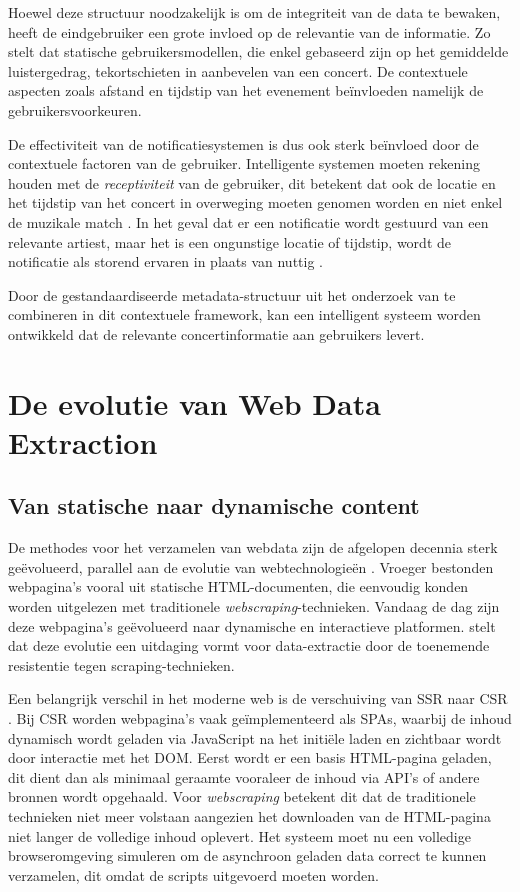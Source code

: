 Hoewel deze structuur noodzakelijk is om de integriteit van de data te bewaken, heeft de eindgebruiker een grote invloed op de relevantie van de informatie.
Zo stelt \textcite{Zangerle2018} dat statische gebruikersmodellen, die enkel gebaseerd zijn op het gemiddelde luistergedrag,
tekortschieten in aanbevelen van een concert. De contextuele aspecten zoals afstand en tijdstip van het evenement beïnvloeden namelijk de gebruikersvoorkeuren.

De effectiviteit van de notificatiesystemen is dus ook sterk beïnvloed door de contextuele factoren van de gebruiker.
Intelligente systemen moeten rekening houden met de \textit{receptiviteit} van de gebruiker, 
dit betekent dat ook de locatie en het tijdstip van het concert in overweging moeten genomen worden en niet enkel de muzikale match \autocite{NotificationSurvey2017}.
In het geval dat er een notificatie wordt gestuurd van een relevante artiest, maar het is een ongunstige locatie of tijdstip, 
wordt de notificatie als storend ervaren in plaats van nuttig \autocite{NotificationSurvey2017}.

Door de gestandaardiseerde metadata-structuur uit het onderzoek van \textcite{Graves2003} te combineren in dit contextuele framework,
kan een intelligent systeem worden ontwikkeld dat de relevante concertinformatie aan gebruikers levert.

\section{De evolutie van Web Data Extraction}

\subsection{Van statische naar dynamische content}

De methodes voor het verzamelen van webdata zijn de afgelopen decennia sterk geëvolueerd, parallel aan de evolutie van webtechnologieën \autocite{Tseriotis2025}.
Vroeger bestonden webpagina's vooral uit statische HTML-documenten, die eenvoudig konden worden uitgelezen met traditionele \textit{webscraping}-technieken.
Vandaag de dag zijn deze webpagina's geëvolueerd naar dynamische en interactieve platformen.
\textcite{Tseriotis2025} stelt dat deze evolutie een uitdaging vormt voor data-extractie door de toenemende resistentie tegen scraping-technieken.

Een belangrijk verschil in het moderne web is de verschuiving van \gls{SSR} naar \gls{CSR} \autocite{Tseriotis2025}.
Bij \gls{CSR} worden webpagina's vaak geïmplementeerd als \glspl{SPA}, waarbij de inhoud dynamisch wordt geladen via JavaScript na het initiële laden en zichtbaar wordt door interactie met het \gls{DOM}.
Eerst wordt er een basis HTML-pagina geladen, dit dient dan als minimaal geraamte vooraleer de inhoud via \gls{API}'s of andere bronnen wordt opgehaald.
Voor \textit{webscraping} betekent dit dat de traditionele technieken niet meer volstaan aangezien het downloaden van de HTML-pagina niet langer de volledige inhoud oplevert.
Het systeem moet nu een volledige browseromgeving simuleren om de asynchroon geladen data correct te kunnen verzamelen, dit omdat de scripts uitgevoerd moeten worden.


